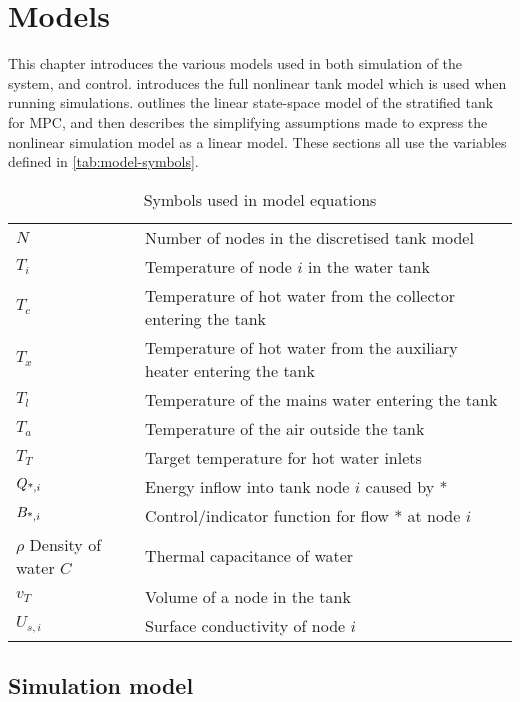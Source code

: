 \chapter{Models}
\label{ch:models}

This chapter introduces the various models used in both simulation of the system, and control.
 introduces the full nonlinear tank model which is used when running simulations.
 outlines the linear state-space model of the stratified tank for MPC, and then describes the simplifying assumptions made to express the nonlinear simulation model as a linear model.
These sections all use the variables defined in \autoref{tab:model-symbols}.

\begin{table}
   \caption{Symbols used in model equations}
   \label{tab:model-symbols}
   \begin{center}
   \begin{tabular}{l l}
      \toprule
      $N$ & Number of nodes in the discretised tank model \\
      $T_i$ & Temperature of node $i$ in the water tank \\
      $T_c$ & Temperature of hot water from the collector entering the tank \\
      $T_x$ & Temperature of hot water from the auxiliary heater entering the tank \\
      $T_l$ & Temperature of the mains water entering the tank \\
      $T_a$ & Temperature of the air outside the tank \\
      $T_T$ & Target temperature for hot water inlets \\
      $Q_{\text{*}, i}$ & Energy inflow into tank node $i$ caused by * \\
      $B_{\text{*}, i}$ & Control/indicator function for flow * at node $i$ \\
      $\rho$ Density of water
      $C$ & Thermal capacitance of water \\
      $v_T$ & Volume of a node in the tank \\
      $U_{s, i}$ & Surface conductivity of node $i$ \\
      \bottomrule
   \end{tabular}
   \end{center}
\end{table}

\section{Simulation model}
\label{sec:models:simulation}

